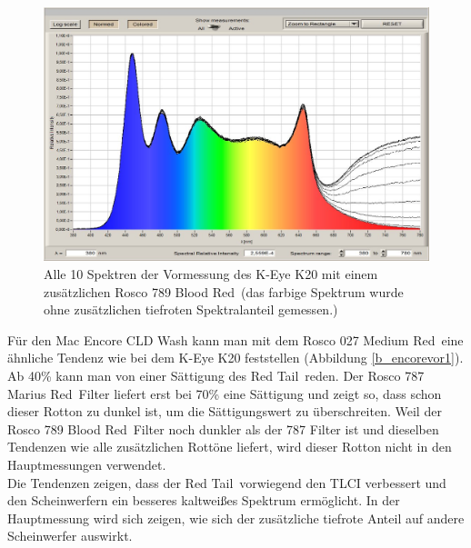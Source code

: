 \begin{figure}[H]     %
\centering
\includegraphics[width=1.0\textwidth]{bilder/keyevor3} 
\caption {Alle 10 Spektren der Vormessung des K-Eye K20 mit einem zusätzlichen Rosco 789 \glqq Blood Red\grqq\ (das farbige Spektrum wurde ohne zusätzlichen tiefroten Spektralanteil gemessen.)}\label{b_keyevor3}
\end{figure}

Für den Mac Encore CLD Wash kann man mit dem Rosco 027 \glqq Medium Red\grqq\ eine ähnliche Tendenz wie bei dem K-Eye K20 feststellen (Abbildung \ref{b_encorevor1}). Ab 40\% kann man von einer Sättigung des \glqq Red Tail\grqq\ reden. Der Rosco 787 \glqq Marius Red\grqq\ Filter liefert erst bei 70\% eine Sättigung und zeigt so, dass schon dieser Rotton zu dunkel ist, um die Sättigungswert zu überschreiten. Weil der Rosco 789 \glqq Blood Red\grqq\ Filter noch dunkler als der 787 Filter ist und dieselben Tendenzen wie alle zusätzlichen Rottöne liefert, wird dieser Rotton nicht in den Hauptmessungen verwendet. \\
Die Tendenzen zeigen, dass der \glqq Red Tail\grqq\ vorwiegend den TLCI verbessert und den Scheinwerfern ein besseres kaltweißes Spektrum ermöglicht. In der Hauptmessung wird sich zeigen, wie sich der zusätzliche tiefrote Anteil auf andere Scheinwerfer auswirkt.

